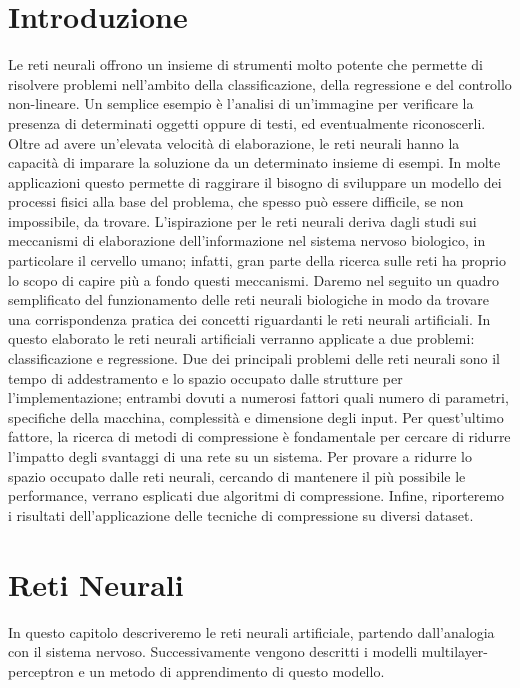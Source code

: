 \documentclass[11pt,a4paper,twoside,
openright]{book}
\begin{document}
\tableofcontents

\chapter*{Introduzione}
Le reti neurali offrono un insieme di strumenti molto potente che permette di risolvere problemi nell’ambito della classificazione, della regressione e del
controllo non-lineare. Un semplice esempio è l’analisi di un’immagine per verificare la presenza di determinati oggetti oppure di testi, ed eventualmente
riconoscerli.
Oltre ad avere un’elevata velocità di elaborazione, le reti neurali hanno la capacità di imparare la soluzione da un determinato insieme di esempi. In molte applicazioni questo permette di raggirare il bisogno di sviluppare un modello dei processi fisici alla base del problema, che spesso può essere difficile, se non impossibile, da trovare.
L’ispirazione per le reti neurali deriva dagli studi sui meccanismi di elaborazione dell’informazione nel sistema nervoso biologico, in particolare il cervello umano; infatti, gran parte della ricerca sulle reti ha proprio lo scopo di capire più a fondo questi meccanismi. Daremo nel seguito un quadro semplificato del funzionamento delle reti neurali biologiche in modo da trovare una corrispondenza pratica dei concetti riguardanti le reti neurali artificiali.
In questo elaborato le reti neurali artificiali verranno applicate a due problemi: classificazione e regressione.
Due dei principali problemi delle reti neurali sono il tempo di addestramento e lo spazio occupato dalle strutture per l’implementazione; entrambi dovuti a numerosi fattori quali numero di parametri, specifiche della macchina, complessità e dimensione degli input. Per quest’ultimo fattore, la ricerca di metodi di compressione è fondamentale per cercare di ridurre l’impatto degli svantaggi di una rete su un sistema. 
Per provare a ridurre lo spazio occupato dalle reti neurali, cercando di mantenere il più possibile le performance, verrano esplicati due algoritmi di compressione. Infine, riporteremo i risultati dell'applicazione delle tecniche di compressione su diversi dataset.
\chapter{Reti Neurali}
In questo capitolo descriveremo le reti neurali artificiale, partendo dall'analogia con il sistema nervoso. Successivamente vengono descritti i modelli multilayer-perceptron e un metodo di apprendimento di questo modello.
\end{document}
